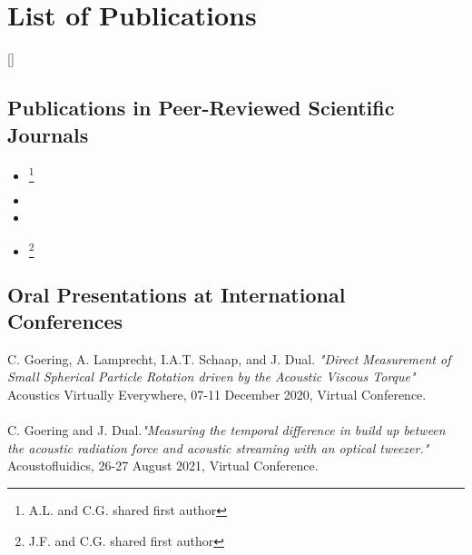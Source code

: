 \chapter*{List of Publications}


\makeatletter
\DeclareCiteCommand{\fullcite}
  {%
    }
  {\usedriver
     {}
     {}}
  {\multicitedelim}
  {}
\DeclareCiteCommand{\footfullcite}[\mkbibfootnote]
  {%
    }
  {\usedriver
     {}
     {}}
  {\multicitedelim}
  {}
\makeatother

\section*{Publications in Peer-Reviewed Scientific Journals}
\begin{itemize}
  \item {}\footnote{A.L. and C.G. shared first author}
  \item {}
  \item {}
  \item {}\footnote{J.F. and C.G. shared first author}
\end{itemize}


\section*{Oral Presentations at International Conferences}
C. Goering, A. Lamprecht, I.A.T. Schaap, and J. Dual.  \emph{"Direct 
Measurement of Small Spherical Particle Rotation driven by the Acoustic Viscous 
Torque"} Acoustics Virtually Everywhere, 07-11 December 2020, Virtual 
Conference.\\
  \\
C. Goering and J. Dual.\emph{"Measuring the temporal difference in build up 
between the acoustic radiation force and acoustic streaming with an optical 
tweezer."} Acoustofluidics, 26-27 August 2021, Virtual Conference.\\
